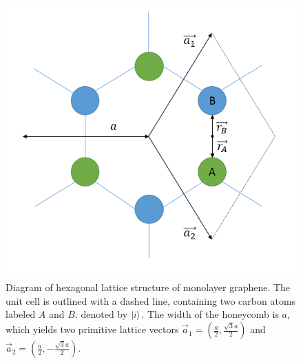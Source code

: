 \documentclass{article}
\begin{document}
\begin{figure}[h]
\centering
\includegraphics[scale=.5]{monolayer}
\caption{Diagram of hexagonal lattice structure of monolayer graphene. The unit cell is outlined with a dashed line, containing two carbon atoms labeled $A$ and $B$. denoted by $\ket{i}$. The width of the honeycomb is $a$, which
yields two primitive lattice vectors $\vec{a}_{1} = (\frac{a}{2}, \frac{\sqrt{3}a}{2})$ and $\vec{a}_{2} = (\frac{a}{2}, -\frac{\sqrt{3}a}{2})$.}
\end{figure}
\end{document}
